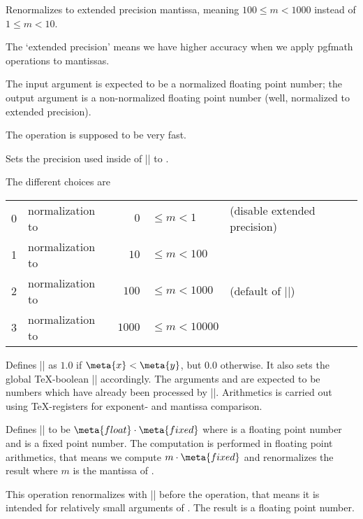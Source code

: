 \begin{command}{}
Renormalizes  to extended precision mantissa, meaning
$100 \le m < 1000$ instead of $1 \le m < 10$.

The `extended precision' means we have higher accuracy when we apply pgfmath operations to mantissas.

The input argument is expected to be a normalized floating point number; the output argument is a non-normalized floating point number (well, normalized to extended precision).

The operation is supposed to be very fast.
\end{command}

\begin{command}{\pgfmathfloatsetextprecision{}}
	Sets the precision used inside of |\pgfmathfloattoextentedprecision| to .

	The different choices are
	
	\begin{tabular}{llrll}
	0 & normalization to &    $0$ & $\le m < 1$ 	& (disable extended precision)\\
	1 & normalization to &   $10$ & $\le m < 100$	\\
	2 & normalization to & 	$100$ & $\le m < 1000$	& (default of |\pgfmathfloattoextentedprecision|)\\
	3 & normalization to & $1000$ & $\le m < 10000$	\\
	\end{tabular}
\end{command}

\begin{command}{}
	Defines |\pgfmathresult| as $1.0$ if $\meta{x} < \meta{y}$, but $0.0$ otherwise. It also sets the global \TeX-boolean |\pgfmathfloatcomparison| accordingly. The arguments  and  are expected to be numbers which have already been processed by |\pgfmathfloatparsenumber|. Arithmetics is carried out using \TeX-registers for exponent- and mantissa comparison.
\end{command}

\begin{command}{\pgfmathfloatmultiplyfixed{}}
	Defines |\pgfmathresult| to be $\meta{float} \cdot \meta{fixed}$ where  is a floating point number and  is a fixed point number. The computation is performed in floating point arithmetics, that means we compute $m \cdot \meta{fixed}$ and renormalizes the result where $m$ is the mantissa of .

	This operation renormalizes  with |\pgfmathfloattoextentedprecision| before the operation, that means it is intended for relatively small arguments of . The result is a floating point number.
\end{command}

